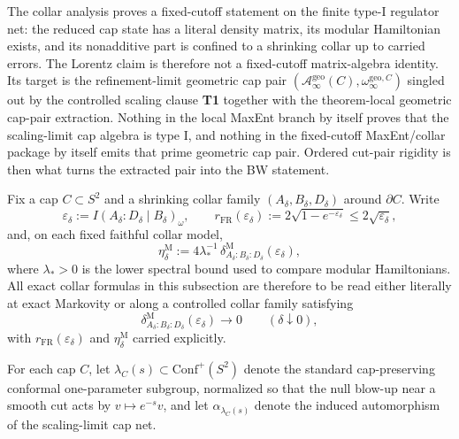 The collar analysis proves a fixed-cutoff statement on the finite type-I regulator net: the reduced cap state has a literal density matrix, its modular Hamiltonian exists, and its nonadditive part is confined to a shrinking collar up to carried errors. The Lorentz claim is therefore not a fixed-cutoff matrix-algebra identity. Its target is the refinement-limit geometric cap pair \((\mathcal A_\infty^{\mathrm{geo}}(C),\omega_\infty^{\mathrm{geo},C})\) singled out by the controlled scaling clause \textbf{T1} together with the theorem-local geometric cap-pair extraction. Nothing in the local MaxEnt branch by itself proves that the scaling-limit cap algebra is type I, and nothing in the fixed-cutoff MaxEnt/collar package by itself emits that prime geometric cap pair. Ordered cut-pair rigidity is then what turns the extracted pair into the BW statement.

Fix a cap \(C\subset S^2\) and a shrinking collar family \((A_\delta,B_\delta,D_\delta)\) around \(\partial C\). Write
\[
\varepsilon_\delta:=I(A_\delta:D_\delta\mid B_\delta)_\omega,
\qquad
r_{\mathrm{FR}}(\varepsilon_\delta):=
2\sqrt{1-e^{-\varepsilon_\delta}}
\le 2\sqrt{\varepsilon_\delta},
\]
and, on each fixed faithful collar model,
\[
\eta_\delta^{\mathrm M}
:=
4\lambda_\ast^{-1}\,
\delta^{\mathrm M}_{A_\delta:B_\delta:D_\delta}(\varepsilon_\delta),
\]
where \(\lambda_\ast>0\) is the lower spectral bound used to compare modular Hamiltonians. All exact collar formulas in this subsection are therefore to be read either literally at exact Markovity or along a controlled collar family satisfying
\[
\delta^{\mathrm M}_{A_\delta:B_\delta:D_\delta}(\varepsilon_\delta)\to 0
\qquad(\delta\downarrow 0),
\]
with \(r_{\mathrm{FR}}(\varepsilon_\delta)\) and \(\eta_\delta^{\mathrm M}\) carried explicitly.

For each cap \(C\), let \(\lambda_C(s)\subset \mathrm{Conf}^+(S^2)\) denote the standard cap-preserving conformal one-parameter subgroup, normalized so that the null blow-up near a smooth cut acts by \(v\mapsto e^{-s}v\), and let \(\alpha_{\lambda_C(s)}\) denote the induced automorphism of the scaling-limit cap net.

